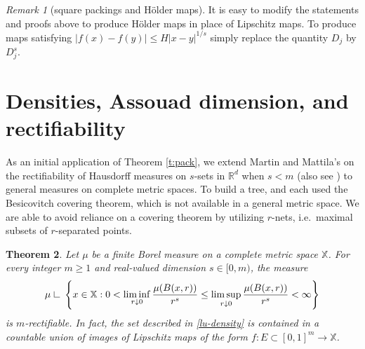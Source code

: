 \documentclass[12pt]{amsart}
\newtheorem{theorem}{Theorem}[section]
\theoremstyle{definition}
\theoremstyle{remark}
\newtheorem{remark}[theorem]{Remark}
\newcommand{\RR}{\mathbb{R}}
\newcommand{\XX}{\mathbb{X}}
\newcommand{\res}{\hbox{ {\vrule height .22cm}{\leaders\hrule\hskip.2cm} }} %
\numberwithin{figure}{section}
\numberwithin{equation}{section}
\begin{document}
\begin{remark}[square packings and H\"older maps] \label{r:holder} It is easy to modify the statements and proofs above to produce H\"older maps in place of Lipschitz maps. To produce maps satisfying $|f(x)-f(y)|\leq H|x-y|^{1/s}$ simply replace the quantity $D_j$ by $D_j^s$.\end{remark}

\section{Densities, Assouad dimension, and rectifiability}\label{s:density}

As an initial application of Theorem \ref{t:pack}, we extend Martin and Mattila's \cite[Theorem 4.1(1)]{MM1988} on the rectifiability of Hausdorff measures on $s$-sets in $\RR^d$ when $s<m$ (also see \cite[Theorem C]{BV}) to general measures on complete metric spaces. To build a tree, \cite{MM1988} and \cite{BV} each used the Besicovitch covering theorem, which is not available in a general metric space. We are able to avoid reliance on a covering theorem by utilizing $r$-nets, i.e.~maximal subsets of $r$-separated points.

\begin{theorem}\label{t:mm} Let $\mu$ be a finite Borel measure on a complete metric space $\XX$. For every integer $m\geq 1$ and real-valued dimension $s\in[0,m)$, the measure \begin{equation}\label{lu-density}\mu\res\left\{x\in\XX: 0<\liminf_{r\downarrow 0} \frac{\mu(B(x,r))}{r^s}\leq \limsup_{r\downarrow 0} \frac{\mu(B(x,r))}{r^s}<\infty\right\}\end{equation} is $m$-rectifiable. In fact, the set described in \eqref{lu-density} is contained in a countable union of images of Lipschitz maps of the form $f:E\subset[0,1]^m\rightarrow\XX$.
\end{theorem}
\end{document}

